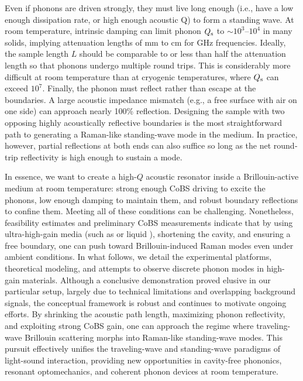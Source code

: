 Even if phonons are driven strongly, they must live long enough (i.e., have a low enough dissipation rate, or high enough acoustic Q) to form a standing wave. At room temperature, intrinsic damping can limit phonon \(Q_{\rm s}\) to \(\sim 10^{3}\)–\(10^{4}\) in many solids, \cite{heiman1979brillouin, bucaro1974high} implying attenuation lengths of \si{\milli\meter} to \si{\centi\meter} for \si{\giga\hertz} frequencies. Ideally, the sample length \(L\) should be comparable to or less than half the attenuation length so that phonons undergo multiple round trips. This is considerably more difficult at room temperature than at cryogenic temperatures, where \(Q_{\rm s}\) can exceed \(10^{7}\). \cite{maris1990phonon, renninger2018bulk} Finally, the phonon must reflect rather than escape at the boundaries. A large acoustic impedance mismatch (e.g., a free surface with air on one side) can approach nearly 100\% reflection. \cite{galliou2013extremely, auld1973acoustic} Designing the sample with two opposing highly acoustically reflective boundaries is the most straightforward path to generating a Raman-like standing-wave mode in the medium. In practice, however, partial reflections at both ends can also suffice so long as the net round‐trip reflectivity is high enough to sustain a mode.

In essence, we want to create a high-\(Q\) acoustic resonator inside a Brillouin-active medium at room temperature: strong enough \ac{CoBS} driving to excite the phonons, low enough damping to maintain them, and robust boundary reflections to confine them. Meeting all of these conditions can be challenging. Nonetheless, feasibility estimates and preliminary \ac{CoBS} measurements indicate that by using ultra-high-gain media (such as  \cite{sanghera2010nonlinear, abedin2005observation} or liquid  \cite{boyd2020nonlinear}), shortening the cavity, and ensuring a free boundary, one can push toward Brillouin-induced Raman modes even under ambient conditions. In what follows, we detail the experimental platforms, theoretical modeling, and attempts to observe discrete phonon modes in high-gain materials. Although a conclusive demonstration proved elusive in our particular setup, largely due to technical limitations and overlapping background signals, the conceptual framework is robust and continues to motivate ongoing efforts. By shrinking the acoustic path length, maximizing phonon reflectivity, and exploiting strong \ac{CoBS} gain, one can approach the regime where traveling-wave Brillouin scattering morphs into Raman-like standing-wave modes. This pursuit effectively unifies the traveling-wave and standing-wave paradigms of light-sound interaction, providing new opportunities in cavity-free phononics, resonant optomechanics, and coherent phonon devices at room temperature.

